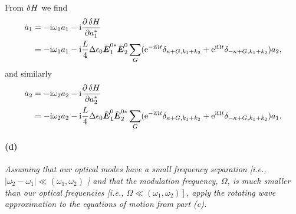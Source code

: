 \documentclass[hyperref, a4paper]{article}
\newcommand*{\ii}{\mathrm{i}}
\newcommand*{\ee}{\mathrm{e}}
\newcommand*{\mvb}[1]{\tilde{\vb*{#1}}}
\begin{document}
From $\var{H}$ we find 
\begin{equation}
    \begin{aligned}
        \dot{a}_1 &= - \ii \omega_1 a_1 - \ii \pdv{\var{H}}{a_1^*} \\
        &= - \ii \omega_1 a_1 - \ii \frac{L}{4} \Delta \epsilon_0 \mvb{E}_1^{0*} \mvb{E}_2^0 \sum_G (\ee^{- \ii \Omega t} \delta_{\kappa + G, k_1 + k_2} + \ee^{\ii \Omega t} \delta_{-\kappa + G, k_1+k_2})  a_2,
    \end{aligned}
\end{equation}
and similarly 
\begin{equation}
    \begin{aligned}
        \dot{a}_2 &= - \ii \omega_2 a_2 - \ii \pdv{\var{H}}{a_2^*} \\
        &= - \ii \omega_2 a_2 - \ii \frac{L}{4} \Delta \epsilon_0 \mvb{E}_1^{0} \mvb{E}_2^{0*} \sum_G (\ee^{- \ii \Omega t} \delta_{\kappa + G, k_1 + k_2} + \ee^{\ii \Omega t} \delta_{-\kappa + G, k_1+k_2})  a_1.
    \end{aligned}
\end{equation}

\paragraph*{(d)} \textit{Assuming that our optical modes have a small frequency separation [i.e., $\left|\omega_2-\omega_1\right| \ll\left(\omega_1, \omega_2\right)$ ] and that the modulation frequency, $\Omega$, is much smaller than our optical frequencies [i.e., $\left.\Omega \ll\left(\omega_1, \omega_2\right)\right]$, apply the rotating wave approximation to the equations of motion from part (c).} 
\end{document}
